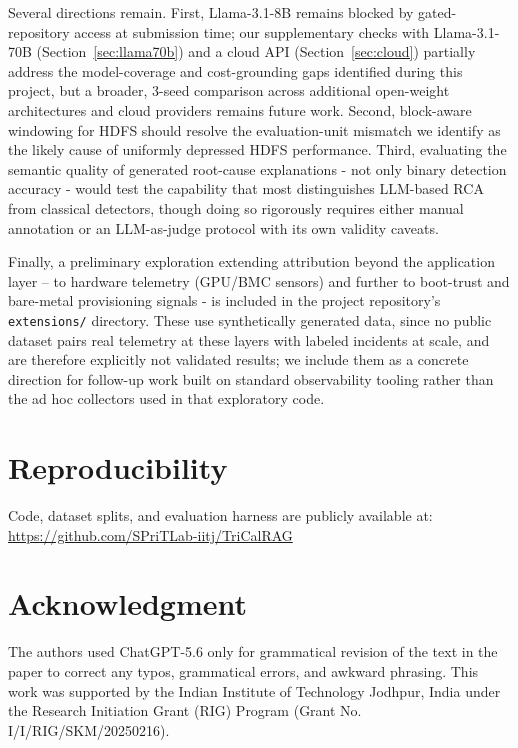 \documentclass[10pt,conference]{IEEEtran}
\begin{document}
Several directions remain. First, Llama-3.1-8B remains blocked by
gated-repository access at submission time; our supplementary checks
with Llama-3.1-70B (Section~\ref{sec:llama70b}) and a cloud API
(Section~\ref{sec:cloud}) partially address the model-coverage and
cost-grounding gaps identified during this project, but a broader,
3-seed comparison across additional open-weight architectures and cloud
providers remains future work. Second, block-aware windowing for HDFS
should resolve the evaluation-unit mismatch we identify as the likely
cause of uniformly depressed HDFS performance. Third, evaluating the
semantic quality of generated root-cause explanations - not only binary
detection accuracy - would test the capability that most distinguishes
LLM-based RCA from classical detectors, though doing so rigorously
requires either manual annotation or an LLM-as-judge protocol with its
own validity caveats.

Finally, a preliminary exploration extending attribution beyond the
application layer -- to hardware telemetry (GPU/BMC sensors) and further
to boot-trust and bare-metal provisioning signals - is included in the
project repository's \texttt{extensions/} directory. These use
synthetically generated data, since no public dataset pairs real
telemetry at these layers with labeled incidents at scale, and are
therefore explicitly not validated results; we include them as a concrete
direction for follow-up work built on standard observability tooling
rather than the ad hoc collectors used in that exploratory code.
%

\section*{Reproducibility}
Code, dataset splits, and evaluation harness are publicly available at:
\url{https://github.com/SPriTLab-iitj/TriCalRAG}

\section*{Acknowledgment}
The authors used ChatGPT-5.6 only for grammatical revision of the text in the paper to correct any typos, grammatical errors, and awkward phrasing. This work was supported by the Indian Institute of Technology Jodhpur, India under the Research Initiation Grant (RIG)
Program (Grant No. I/I/RIG/SKM/20250216).



\end{document}
